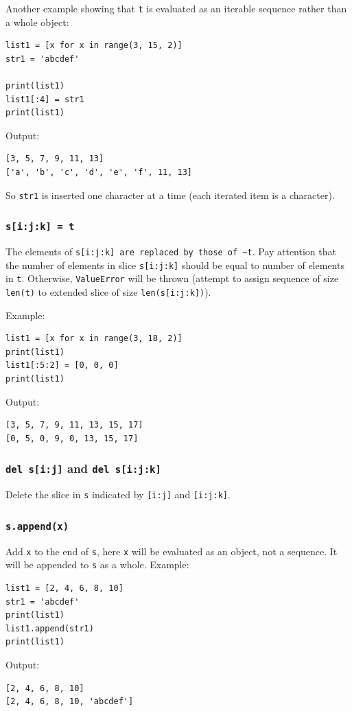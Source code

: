 \documentclass[12pt]{book}
\begin{document}
Another example showing that \texttt{t} is evaluated as an iterable sequence rather than a whole object:
\begin{verbatim}
list1 = [x for x in range(3, 15, 2)]
str1 = 'abcdef'

print(list1)
list1[:4] = str1
print(list1)
\end{verbatim}
Output:
\begin{verbatim}
[3, 5, 7, 9, 11, 13]
['a', 'b', 'c', 'd', 'e', 'f', 11, 13]
\end{verbatim}
So \texttt{str1} is inserted one character at a time (each iterated item is a character).

\subsubsection{\texttt{s[i:j:k] = t}}
\label{sec:org09eb700}
The elements of \texttt{s[i:j:k] are replaced by those of \textasciitilde{}t}. Pay attention that the number of elements in slice \texttt{s[i:j:k]} should be equal to number of elements in \texttt{t}. Otherwise, \texttt{ValueError} will be thrown (attempt to assign sequence of size \texttt{len(t)} to extended slice of size \texttt{len(s[i:j:k])}).

Example:
\begin{verbatim}
list1 = [x for x in range(3, 18, 2)]
print(list1)
list1[:5:2] = [0, 0, 0]
print(list1)
\end{verbatim}
Output:
\begin{verbatim}
[3, 5, 7, 9, 11, 13, 15, 17]
[0, 5, 0, 9, 0, 13, 15, 17]
\end{verbatim}

\subsubsection{\texttt{del s[i:j]} and \texttt{del s[i:j:k]}}
\label{sec:org72fd150}
Delete the slice in \texttt{s} indicated by \texttt{[i:j]} and \texttt{[i:j:k]}.
\subsubsection{\texttt{s.append(x)}}
\label{sec:org98f52b6}
Add \texttt{x} to the end of \texttt{s}, here \texttt{x} will be evaluated as an object, not a sequence. It will be appended to \texttt{s} as a whole. Example:
\begin{verbatim}
list1 = [2, 4, 6, 8, 10]
str1 = 'abcdef'
print(list1)
list1.append(str1)
print(list1)
\end{verbatim}
Output:
\begin{verbatim}
[2, 4, 6, 8, 10]
[2, 4, 6, 8, 10, 'abcdef']
\end{verbatim}
\end{document}
